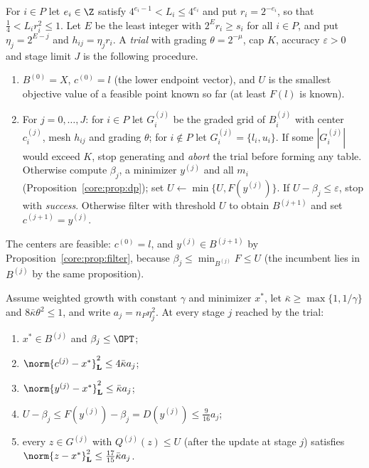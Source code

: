 \begin{definition}\label{core:def:trial}
For $i\in P$ let $e_i\in\Z$ satisfy $4^{e_i-1}<L_i\le4^{e_i}$ and put
$r_i=2^{-e_i}$, so that $\frac14<L_ir_i^2\le1$. Let $E$ be the least integer
with $2^Er_i\ge s_i$ for all $i\in P$, and put $\eta_j=2^{E-j}$ and
$h_{ij}=\eta_jr_i$. A \emph{trial} with grading $\theta=2^{-\mu}$, cap $K$,
accuracy $\varepsilon>0$ and stage limit $J$ is the following procedure.
\begin{enumerate}
\item $B^{(0)}=X$, $c^{(0)}=l$ (the lower endpoint vector), and $U$ is the
smallest objective value of a feasible point known so far (at least $F(l)$
is known).
\item For $j=0,\dots,J$: for $i\in P$ let $G_i^{(j)}$ be the graded grid of
$B_i^{(j)}$ with center $c_i^{(j)}$, mesh $h_{ij}$ and grading $\theta$; for
$i\notin P$ let $G_i^{(j)}=\{l_i,u_i\}$. If some $|G_i^{(j)}|$ would exceed
$K$, stop generating and \emph{abort} the trial before forming any table.
Otherwise compute $\beta_j$, a minimizer $y^{(j)}$ and all $m_i$
(Proposition~\ref{core:prop:dp}); set $U\leftarrow\min\{U,F(y^{(j)})\}$. If
$U-\beta_j\le\varepsilon$, stop with \emph{success}. Otherwise filter with
threshold $U$ to obtain $B^{(j+1)}$ and set $c^{(j+1)}=y^{(j)}$.
\end{enumerate}
\end{definition}

The centers are feasible: $c^{(0)}=l$, and $y^{(j)}\in B^{(j+1)}$ by
Proposition~\ref{core:prop:filter}, because $\beta_j\le\min_{B^{(j)}}F\le U$
(the incumbent lies in $B^{(j)}$ by the same proposition).

\begin{lemma}\label{core:lem:inv}
Assume weighted growth with constant $\gamma$ and minimizer $x^*$, let
$\bar\kappa\ge\max\{1,1/\gamma\}$ and $8\bar\kappa\theta^2\le1$, and write
$a_j=n_P\eta_j^2$. At every stage $j$ reached by the trial:
\begin{enumerate}
\item[(i)] $x^*\in B^{(j)}$ and $\beta_j\le\OPT$;
\item[(ii)] $\norm{c^{(j)}-x^*}_{\mathbf L}^2\le4\bar\kappa a_j$;
\item[(iii)] $\norm{y^{(j)}-x^*}_{\mathbf L}^2\le\bar\kappa a_j$;
\item[(iv)] $U-\beta_j\le F(y^{(j)})-\beta_j=D(y^{(j)})\le\frac9{16}a_j$;
\item[(v)] every $z\in G^{(j)}$ with $Q^{(j)}(z)\le U$ (after the update at
stage $j$) satisfies $\norm{z-x^*}_{\mathbf L}^2\le\frac{17}{15}\bar\kappa a_j$.
\end{enumerate}
\end{lemma}


